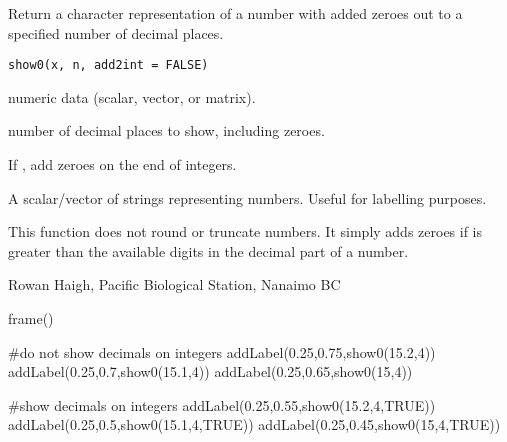 \documentclass[letterpaper]{book}
\begin{document}
\begin{Description}\relax
Return a character representation of a number with added zeroes 
out to a specified number of decimal places.
\end{Description}
\begin{Usage}
\begin{verbatim}
show0(x, n, add2int = FALSE)
\end{verbatim}
\end{Usage}
\begin{Arguments}
\begin{ldescription}
\item[\code{x}] numeric data (scalar, vector, or matrix).
\item[\code{n}] number of decimal places to show, including zeroes.
\item[\code{add2int}] If , add zeroes on the end of integers.
\end{ldescription}
\end{Arguments}
\begin{Value}
A scalar/vector of strings representing numbers. Useful for labelling purposes.
\end{Value}
\begin{Note}\relax
This function does not round or truncate numbers. It simply adds zeroes if 
 is greater than the available digits in the decimal part of a number.
\end{Note}
\begin{Author}\relax
Rowan Haigh, Pacific Biological Station, Nanaimo BC
\end{Author}
\begin{Examples}
\begin{ExampleCode}
frame()

#do not show decimals on integers
addLabel(0.25,0.75,show0(15.2,4))
addLabel(0.25,0.7,show0(15.1,4))
addLabel(0.25,0.65,show0(15,4))

#show decimals on integers
addLabel(0.25,0.55,show0(15.2,4,TRUE))
addLabel(0.25,0.5,show0(15.1,4,TRUE))
addLabel(0.25,0.45,show0(15,4,TRUE))
\end{ExampleCode}
\end{Examples}
\end{document}
